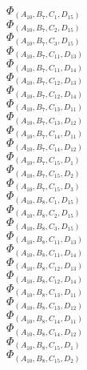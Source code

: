 \documentclass[14pt]{article}
\begin{document}
    $\Phi_{({A}_{10}, {B}_{7}, {C}_{1}, {D}_{15})}$ \\ 
    $\Phi_{({A}_{10}, {B}_{7}, {C}_{2}, {D}_{15})}$ \\ 
    $\Phi_{({A}_{10}, {B}_{7}, {C}_{3}, {D}_{15})}$ \\ 
    $\Phi_{({A}_{10}, {B}_{7}, {C}_{11}, {D}_{13})}$ \\ 
    $\Phi_{({A}_{10}, {B}_{7}, {C}_{11}, {D}_{14})}$ \\ 
    $\Phi_{({A}_{10}, {B}_{7}, {C}_{12}, {D}_{13})}$ \\ 
    $\Phi_{({A}_{10}, {B}_{7}, {C}_{12}, {D}_{14})}$ \\ 
    $\Phi_{({A}_{10}, {B}_{7}, {C}_{13}, {D}_{11})}$ \\ 
    $\Phi_{({A}_{10}, {B}_{7}, {C}_{13}, {D}_{12})}$ \\ 
    $\Phi_{({A}_{10}, {B}_{7}, {C}_{14}, {D}_{11})}$ \\ 
    $\Phi_{({A}_{10}, {B}_{7}, {C}_{14}, {D}_{12})}$ \\ 
    $\Phi_{({A}_{10}, {B}_{7}, {C}_{15}, {D}_{1})}$ \\ 
    $\Phi_{({A}_{10}, {B}_{7}, {C}_{15}, {D}_{2})}$ \\ 
    $\Phi_{({A}_{10}, {B}_{7}, {C}_{15}, {D}_{3})}$ \\ 
    $\Phi_{({A}_{10}, {B}_{8}, {C}_{1}, {D}_{15})}$ \\ 
    $\Phi_{({A}_{10}, {B}_{8}, {C}_{2}, {D}_{15})}$ \\ 
    $\Phi_{({A}_{10}, {B}_{8}, {C}_{3}, {D}_{15})}$ \\ 
    $\Phi_{({A}_{10}, {B}_{8}, {C}_{11}, {D}_{13})}$ \\ 
    $\Phi_{({A}_{10}, {B}_{8}, {C}_{11}, {D}_{14})}$ \\ 
    $\Phi_{({A}_{10}, {B}_{8}, {C}_{12}, {D}_{13})}$ \\ 
    $\Phi_{({A}_{10}, {B}_{8}, {C}_{12}, {D}_{14})}$ \\ 
    $\Phi_{({A}_{10}, {B}_{8}, {C}_{13}, {D}_{11})}$ \\ 
    $\Phi_{({A}_{10}, {B}_{8}, {C}_{13}, {D}_{12})}$ \\ 
    $\Phi_{({A}_{10}, {B}_{8}, {C}_{14}, {D}_{11})}$ \\ 
    $\Phi_{({A}_{10}, {B}_{8}, {C}_{14}, {D}_{12})}$ \\ 
    $\Phi_{({A}_{10}, {B}_{8}, {C}_{15}, {D}_{1})}$ \\ 
    $\Phi_{({A}_{10}, {B}_{8}, {C}_{15}, {D}_{2})}$ \\ 
\end{document}
